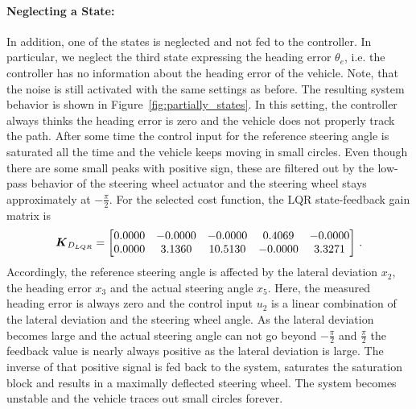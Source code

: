\paragraph{Neglecting a State: } In addition, one of the states is neglected and not fed to the controller.
In particular, we neglect the third state expressing the heading error $\theta_e$, i.e. the controller has no information about the heading error of the vehicle.
Note, that the noise is still activated with the same settings as before.
The resulting system behavior is shown in Figure~\ref{fig:partially_states}.
In this setting, the controller always thinks the heading error is zero and the vehicle does not properly track the path.
After some time the control input for the reference steering angle is saturated all the time and the vehicle keeps moving in small circles.
Even though there are some small peaks with positive sign, these are filtered out by the low-pass behavior of the steering wheel actuator and the steering wheel stays approximately at $-\frac{\pi}{2}$.
For the selected cost function, the LQR state-feedback gain matrix is
\begin{equation}
	\boldsymbol{K}_{D_{LQR}} = \begin{bmatrix}
	0.0000 &  -0.0000  & -0.0000  &  0.4069 &  -0.0000\\
    0.0000  &  3.1360 &  10.5130 &  -0.0000  &  3.3271	
	\end{bmatrix}\, .
\end{equation}
Accordingly, the reference steering angle is affected by the lateral deviation $x_2$, the heading error $x_3$ and the actual steering angle $x_5$. 
Here, the measured heading error is always zero and the control input $u_2$ is a linear combination of the lateral deviation and the steering wheel angle.
As the lateral deviation becomes large and the actual steering angle can not go beyond $-\frac{\pi}{2}$ and $\frac{\pi}{2}$ the feedback value is nearly always positive as the lateral deviation is large.
The inverse of that positive signal is fed back to the system, saturates the saturation block and results in a maximally deflected steering wheel.
The system becomes unstable and the vehicle traces out small circles forever.

